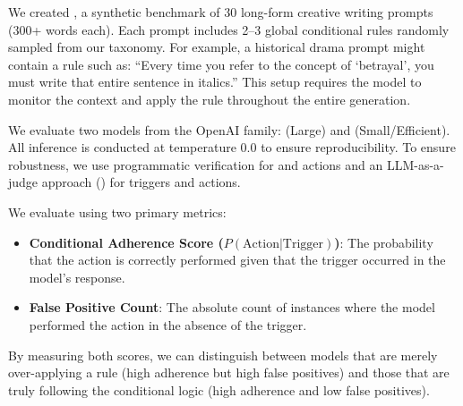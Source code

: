 We created \benchmark, a synthetic benchmark of 30 long-form creative writing prompts (300+ words each). Each prompt includes 2--3 global conditional rules randomly sampled from our taxonomy. For example, a historical drama prompt might contain a rule such as: ``Every time you refer to the concept of `betrayal', you must write that entire sentence in italics.'' This setup requires the model to monitor the context and apply the rule throughout the entire generation.

We evaluate two models from the OpenAI family: \gptlarge (Large) and \gptmini (Small/Efficient). All inference is conducted at temperature 0.0 to ensure reproducibility. To ensure robustness, we use programmatic verification for \lexical and \formatting actions and an LLM-as-a-judge approach (\gptmini) for \conceptual triggers and \content actions.

We evaluate \ifcapacity using two primary metrics:
\begin{itemize}[leftmargin=*,itemsep=0pt,topsep=0pt]
    \item {\bf Conditional Adherence Score ($P(\text{Action} | \text{Trigger})$)}: The probability that the action is correctly performed given that the trigger occurred in the model's response.
    \item {\bf False Positive Count}: The absolute count of instances where the model performed the action in the absence of the trigger.
\end{itemize}

By measuring both scores, we can distinguish between models that are merely over-applying a rule (high adherence but high false positives) and those that are truly following the conditional logic (high adherence and low false positives).
